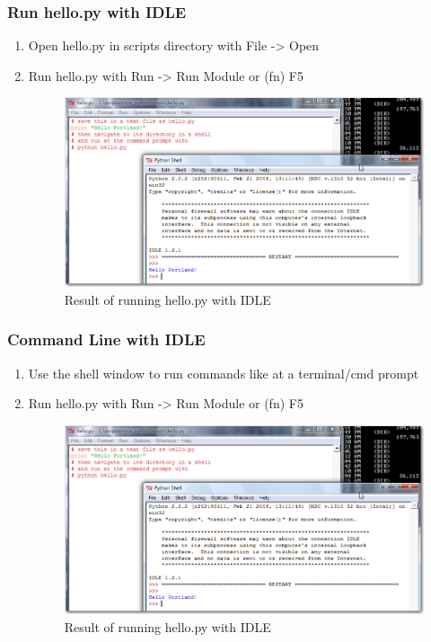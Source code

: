 \documentclass{beamer}
\begin{document}
\begin{frame}[fragile]
\frametitle{Run hello.py with IDLE}
\begin{enumerate}
\item Open hello.py in scripts directory with File -> Open
\item Run hello.py with Run -> Run Module or (fn) F5
  \begin{figure}
 \includegraphics[scale=0.4]{hello_idle.jpg} 
 \caption{Result of running hello.py with IDLE}
 \end{figure}
 \end{enumerate}
\end{frame}

\begin{frame}[fragile]
\frametitle{Command Line with IDLE}
\begin{enumerate}
\item Use the shell window to run commands like at a terminal/cmd prompt
\item Run hello.py with Run -> Run Module or (fn) F5
  \begin{figure}
 \includegraphics[scale=0.4]{hello_idle.jpg} 
 \caption{Result of running hello.py with IDLE}
 \end{figure}
 \end{enumerate}
\end{frame}
\end{document}
